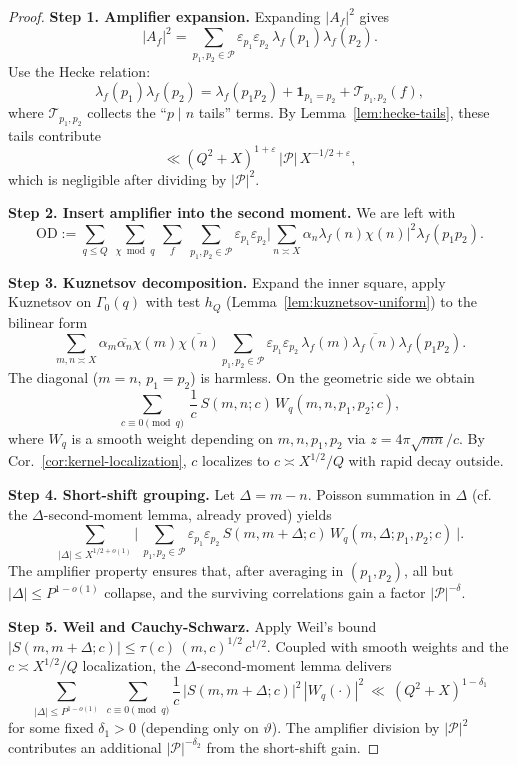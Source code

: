 \documentclass[11pt]{article}
\theoremstyle{definition}
\theoremstyle{remark}
\numberwithin{equation}{part}
\begin{document}
\begin{proof}
	\textbf{Step 1. Amplifier expansion.}
	Expanding $|A_f|^2$ gives
	\[
		|A_f|^2
		=\sum_{p_1,p_2\in\mathcal P}\varepsilon_{p_1}\varepsilon_{p_2}\,\lambda_f(p_1)\lambda_f(p_2).
	\]
	Use the Hecke relation:
	\[
		\lambda_f(p_1)\lambda_f(p_2)
		=\lambda_f(p_1p_2)+\mathbf1_{p_1=p_2}+\mathcal T_{p_1,p_2}(f),
	\]
	where $\mathcal T_{p_1,p_2}$ collects the ``$p\mid n$ tails'' terms.
	By Lemma~\ref{lem:hecke-tails}, these tails contribute
	\[
		\ll (Q^2+X)^{1+\varepsilon}\,|\mathcal P|\,X^{-1/2+\varepsilon},
	\]
	which is negligible after dividing by $|\mathcal P|^2$.

	\smallskip
	\textbf{Step 2. Insert amplifier into the second moment.}
	We are left with
	\[
		\mathrm{OD}
		:=\sum_{q\le Q}\ \sum_{\chi\bmod q}\ \sum_f
		\ \sum_{p_1,p_2\in\mathcal P}\varepsilon_{p_1}\varepsilon_{p_2}
		\Big|\sum_{n\asymp X}\alpha_n\lambda_f(n)\chi(n)\Big|^2 \lambda_f(p_1p_2).
	\]

	\smallskip
	\textbf{Step 3. Kuznetsov decomposition.}
	Expand the inner square, apply Kuznetsov on $\Gamma_0(q)$ with test $h_Q$ (Lemma~\ref{lem:kuznetsov-uniform}) to the bilinear form
	\[
		\sum_{m,n\asymp X} \alpha_m\overline{\alpha_n}\chi(m)\overline{\chi(n)}
		\sum_{p_1,p_2\in\mathcal P}\varepsilon_{p_1}\varepsilon_{p_2}\,
		\lambda_f(m)\overline{\lambda_f(n)}\lambda_f(p_1p_2).
	\]
	The diagonal ($m=n$, $p_1=p_2$) is harmless.
	On the geometric side we obtain
	\[
		\sum_{c\equiv0\pmod q}\ \frac{1}{c}\,
		S(m,n;c)\,W_{q}(m,n,p_1,p_2;c),
	\]
	where $W_q$ is a smooth weight depending on $m,n,p_1,p_2$ via $z=4\pi\sqrt{mn}/c$.
	By Cor.~\ref{cor:kernel-localization}, $c$ localizes to $c\asymp X^{1/2}/Q$ with rapid decay outside.

	\smallskip
	\textbf{Step 4. Short-shift grouping.}
	Let $\Delta=m-n$.
	Poisson summation in $\Delta$ (cf. the $\Delta$-second-moment lemma, already proved) yields
	\[
		\sum_{|\Delta|\le X^{1/2+o(1)}}
		\Big|\ \sum_{p_1,p_2\in\mathcal P}\varepsilon_{p_1}\varepsilon_{p_2}\,
		S(m,m+\Delta;c)\,W_q(m,\Delta;p_1,p_2;c)\ \Big|.
	\]
	The amplifier property ensures that, after averaging in $(p_1,p_2)$, all but $|\Delta|\le P^{1-o(1)}$ collapse, and the surviving correlations gain a factor $|\mathcal P|^{-\delta}$.

	\smallskip
	\textbf{Step 5. Weil and Cauchy-Schwarz.}
	Apply Weil's bound $|S(m,m+\Delta;c)|\le\tau(c)\,(m,c)^{1/2}\,c^{1/2}$.
	Coupled with smooth weights and the $c\asymp X^{1/2}/Q$ localization, the $\Delta$-second-moment lemma delivers
	\[
		\sum_{|\Delta|\le P^{1-o(1)}}\ \sum_{c\equiv0\pmod q}
		\frac{1}{c}\,|S(m,m+\Delta;c)|^2\,|W_q(\cdot)|^2
		\ \ll\ (Q^2+X)^{1-\delta_1}
	\]
	for some fixed $\delta_1>0$ (depending only on $\vartheta$).
	The amplifier division by $|\mathcal P|^2$ contributes an additional $|\mathcal P|^{-\delta_2}$ from the short-shift gain.


\end{proof}
\end{document}
